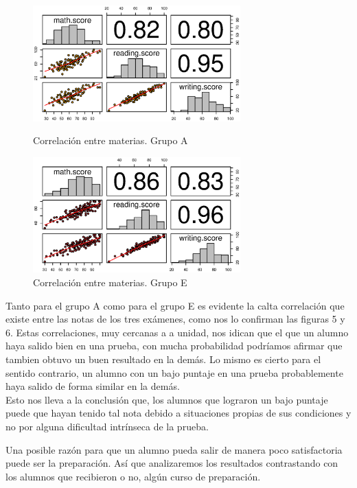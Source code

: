 \documentclass{article}
\begin{document}
    \begin{figure}[ht]
        \begin{minipage}[b]{0.45\linewidth}
            \includegraphics[width=8cm]{Output/Plots/5CorrgrupoA.eps}
            \vspace*{-8.5mm}
            \caption{Correlaci\'on entre materias. Grupo A}
            \label{fig:minipage1}
        \end{minipage}
        \hspace{0.2cm}
        \begin{minipage}[b]{0.45\linewidth}
            \includegraphics[width=8cm]{Output/Plots/6CorrelaciongrupoE.eps}
            \vspace*{-9mm}
            \caption{Correlaci\'on entre materias. Grupo E}
            \label{fig:minipage2}
        \end{minipage}
    \end{figure}

    Tanto para el grupo A como para el grupo E es evidente la calta correlaci\'on que existe entre las notas de los tres ex\'amenes,
     como nos lo confirman las figuras 5 y 6. Estas correlaciones, muy cercanas a a unidad, nos idican que el que un alumno haya salido
     bien en una prueba, con mucha probabilidad podr\'iamos afirmar que tambien obtuvo un buen resultado en la dem\'as. Lo mismo
     es cierto para el sentido contrario, un alumno con un bajo puntaje en una prueba probablemente haya salido de forma similar en la dem\'as.\\

     Esto nos lleva a la conclusi\'on que, los alumnos que lograron un bajo puntaje puede que hayan tenido tal nota debido a
     situaciones propias de sus condiciones y no por alguna dificultad intr\'inseca de la prueba.


    Una posible raz\'on para que un alumno pueda salir de manera poco satisfactoria puede ser la preparaci\'on. As\'i que analizaremos
    los resultados contrastando con los alumnos que recibieron o no, alg\'un curso de preparaci\'on.

    
\end{document}
